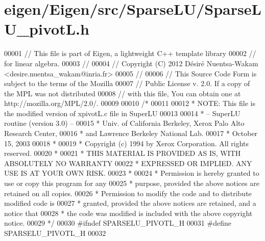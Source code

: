 \hypertarget{eigen_2_eigen_2src_2_sparse_l_u_2_sparse_l_u__pivot_l_8h_source}{}\section{eigen/\+Eigen/src/\+Sparse\+L\+U/\+Sparse\+L\+U\+\_\+pivotL.h}
\label{eigen_2_eigen_2src_2_sparse_l_u_2_sparse_l_u__pivot_l_8h_source}

\begin{DoxyCode}
00001 \textcolor{comment}{// This file is part of Eigen, a lightweight C++ template library}
00002 \textcolor{comment}{// for linear algebra.}
00003 \textcolor{comment}{//}
00004 \textcolor{comment}{// Copyright (C) 2012 Désiré Nuentsa-Wakam <desire.nuentsa\_wakam@inria.fr>}
00005 \textcolor{comment}{//}
00006 \textcolor{comment}{// This Source Code Form is subject to the terms of the Mozilla}
00007 \textcolor{comment}{// Public License v. 2.0. If a copy of the MPL was not distributed}
00008 \textcolor{comment}{// with this file, You can obtain one at http://mozilla.org/MPL/2.0/.}
00009 
00010 \textcolor{comment}{/* }
00011 \textcolor{comment}{ }
00012 \textcolor{comment}{ * NOTE: This file is the modified version of xpivotL.c file in SuperLU }
00013 \textcolor{comment}{ }
00014 \textcolor{comment}{ * -- SuperLU routine (version 3.0) --}
00015 \textcolor{comment}{ * Univ. of California Berkeley, Xerox Palo Alto Research Center,}
00016 \textcolor{comment}{ * and Lawrence Berkeley National Lab.}
00017 \textcolor{comment}{ * October 15, 2003}
00018 \textcolor{comment}{ *}
00019 \textcolor{comment}{ * Copyright (c) 1994 by Xerox Corporation.  All rights reserved.}
00020 \textcolor{comment}{ *}
00021 \textcolor{comment}{ * THIS MATERIAL IS PROVIDED AS IS, WITH ABSOLUTELY NO WARRANTY}
00022 \textcolor{comment}{ * EXPRESSED OR IMPLIED.  ANY USE IS AT YOUR OWN RISK.}
00023 \textcolor{comment}{ *}
00024 \textcolor{comment}{ * Permission is hereby granted to use or copy this program for any}
00025 \textcolor{comment}{ * purpose, provided the above notices are retained on all copies.}
00026 \textcolor{comment}{ * Permission to modify the code and to distribute modified code is}
00027 \textcolor{comment}{ * granted, provided the above notices are retained, and a notice that}
00028 \textcolor{comment}{ * the code was modified is included with the above copyright notice.}
00029 \textcolor{comment}{ */}
00030 \textcolor{preprocessor}{#ifndef SPARSELU\_PIVOTL\_H}
00031 \textcolor{preprocessor}{#define SPARSELU\_PIVOTL\_H}
00032 

\end{DoxyCode}

